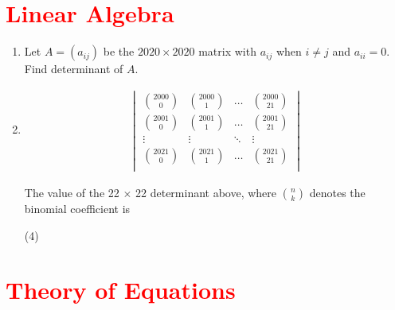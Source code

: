 \documentclass[11pt, a4paper]{article}
\begin{document}
\section{\textcolor{red}{Linear Algebra}}

\begin{enumerate}

	\item Let $A = \left( a_{ij} \right)$ be the $ 2020 \times 2020 $ matrix with $ a_{ij} $ when $i \neq j$ and $a_{ii} = 0$. Find determinant of $A$.
	
	\item 
	\begin{gather*}	
	\begin{vmatrix} 
	\displaystyle{\binom{2000}{0}} & \displaystyle{\binom{2000}{1}} & \ldots & \displaystyle{\binom{2000}{21}} \\[0.5cm]
	\displaystyle{\binom{2001}{0}} & \displaystyle{\binom{2001}{1}} & \ldots & \displaystyle{\binom{2001}{21}} \\[0.5cm]
	\vdots & \vdots & \ddots & \vdots \\[0.5cm]
	\displaystyle{\binom{2021}{0}} & \displaystyle{\binom{2021}{1}} & \ldots & \displaystyle{\binom{2021}{21}} \\ 
	\end{vmatrix}
	\end{gather*}
	
	The value of the 22 $\times$ 22 determinant above, where $\displaystyle{\binom{n}{k}}$ denotes the binomial coefficient is
	\begin{tasks}(4)
	\end{tasks}
\end{enumerate}















\section{\textcolor{red}{Theory of Equations}}
\end{document}
